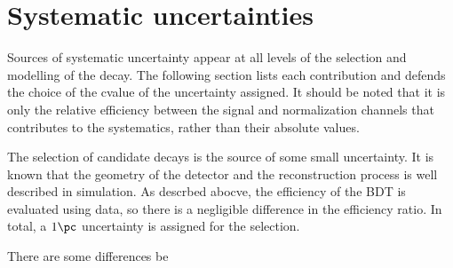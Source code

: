 \section{Systematic uncertainties}
\label{sec:dsphi:syst}

Sources of systematic uncertainty appear at all levels of the selection and modelling of the decay.
The following section lists each contribution and defends the choice of the cvalue of the
uncertainty assigned.
It should be noted that it is only the relative efficiency between the signal and normalization
channels that contributes to the systematics, rather than their absolute values.

The selection of candidate \btodsphi decays is the source of some small uncertainty.
It is known that the geometry of the detector and the reconstruction process is well described in
simulation.
As descrbed abocve, the efficiency of the BDT is evaluated using data, so there is a negligible
difference in the efficiency ratio.
In total, a $1\pc$ uncertainty is assigned for the selection.

There are some differences be


%
%
%
%
%
%
%

